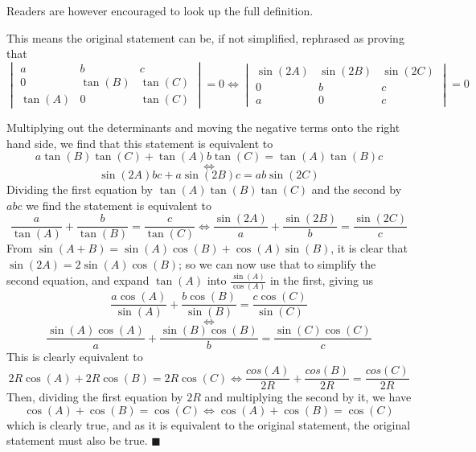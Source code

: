 \documentclass{article}
\begin{document}
Readers are however encouraged to look up the full definition.

This means the original statement can be, if not simplified, rephrased as proving that
\[
\begin{vmatrix}
a&b&c\\
0&\tan(B)&\tan(C)
\\\tan(A)&0&\tan(C)
\end{vmatrix}
=0
\iff{}
\begin{vmatrix}
\sin(2A)&\sin(2B)&\sin(2C)\\
0&b&c\\
a&0&c
\end{vmatrix}
=0
\]

Multiplying out the determinants and moving the negative terms onto the right hand side, we find that this statement is equivalent to
\[a\tan(B)\tan(C)+\tan(A)b\tan(C)=\tan(A)\tan(B)c\]\[\iff{}\]\[\sin(2A)bc+a\sin(2B)c=ab\sin(2C)
\]
Dividing the first equation by \(\tan(A)\tan(B)\tan(C)\) and the second by \(abc\) we find the statement is equivalent to
\[
\frac{a}{\tan(A)}+\frac{b}{\tan(B)}=\frac{c}{\tan(C)}
\iff
\frac{\sin(2A)}{a}+\frac{\sin(2B)}{b}=\frac{\sin(2C)}{c}
\]
From \(\sin(A+B)=\sin(A)\cos(B)+\cos(A)\sin(B)\), it is clear that \(\sin(2A)=2\sin(A)\cos(B)\); so we can now use that to simplify the second equation, and expand \(\tan(A)\) into \(\frac{\sin(A)}{\cos(A)}\) in the first, giving us
\[
\frac{a\cos(A)}{\sin(A)}+\frac{b\cos(B)}{\sin(B)}=\frac{c\cos(C)}{\sin(C)}\]
\[\iff\]
\[\frac{\sin(A)\cos(A)}{a}+\frac{\sin(B)\cos(B)}{b}=\frac{\sin(C)\cos(C)}{c}
\]
This is clearly equivalent to
\[
2R\cos(A)+2R\cos(B)=2R\cos(C)
\iff
\frac{cos(A)}{2R}+\frac{cos(B)}{2R}=\frac{cos(C)}{2R}
\]
Then, dividing the first equation by \(2R\) and multiplying the second by it, we have
\[
\cos(A)+\cos(B)=\cos(C)
\iff
\cos(A)+\cos(B)=\cos(C)
\]
which is clearly true, and as it is equivalent to the original statement, the original statement must also be true. \(\blacksquare{}\)
\end{document}
